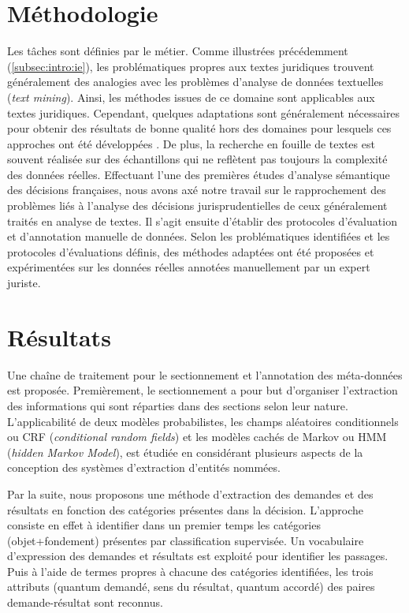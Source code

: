 \section{Méthodologie}
\label{sec:intro:methodologie}
Les tâches sont définies par le métier.
Comme illustrées précédemment (\ref{subsec:intro:ie}), les problématiques propres aux textes juridiques trouvent généralement des analogies avec les problèmes d'analyse de données textuelles (\textit{text mining}). Ainsi, les méthodes issues de ce domaine sont applicables aux textes juridiques. Cependant, quelques adaptations sont généralement nécessaires pour obtenir des résultats de bonne qualité hors des domaines pour lesquels ces approches ont été développées \citep{Waltl2016lexia}. De plus, la recherche en fouille de textes est souvent réalisée sur des échantillons qui ne reflètent pas toujours la complexité des données réelles. Effectuant l'une des premières études d'analyse sémantique des décisions françaises, nous avons axé notre travail sur le rapprochement des problèmes liés à l'analyse des décisions jurisprudentielles de ceux généralement traités en analyse de textes. Il s'agit ensuite d'établir des protocoles d'évaluation et d'annotation manuelle de données. Selon les problématiques identifiées et les protocoles d'évaluations définis, des méthodes adaptées ont été proposées et expérimentées sur les données réelles annotées manuellement par un expert juriste.

\section{Résultats}
\label{sec:intro:résultats}
Une chaîne de traitement pour le sectionnement et l'annotation des méta-données est proposée. Premièrement, le sectionnement a pour but d'organiser l'extraction des informations qui sont réparties dans des sections selon leur nature. L'applicabilité de deux modèles probabilistes, les champs aléatoires conditionnels ou CRF (\textit{conditional random fields}) et les modèles cachés de Markov ou HMM (\textit{hidden Markov Model}), est étudiée en considérant plusieurs aspects de la conception des systèmes d'extraction d'entités nommées.  

Par la suite, nous proposons une méthode d'extraction des demandes et des résultats en fonction des catégories présentes dans la décision. L'approche consiste en effet à identifier dans un premier temps les catégories (objet+fondement) présentes par classification supervisée. Un vocabulaire d'expression des demandes et résultats est exploité pour identifier les passages. Puis à l'aide de termes propres à chacune des catégories identifiées, les trois attributs (quantum demandé, sens du résultat, quantum accordé) des paires demande-résultat sont reconnus. 

